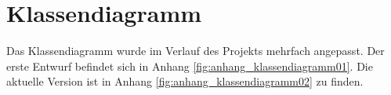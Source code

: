 \section{Klassendiagramm}
\label{sec:Klassendiagramm}
\multipleauthorsection{\authorSG}{\authorNL}

Das Klassendiagramm wurde im Verlauf des Projekts mehrfach angepasst.
Der erste Entwurf befindet sich in Anhang \vref{fig:anhang_klassendiagramm01}.
Die aktuelle Version ist in Anhang \vref{fig:anhang_klassendiagramm02} zu finden.
